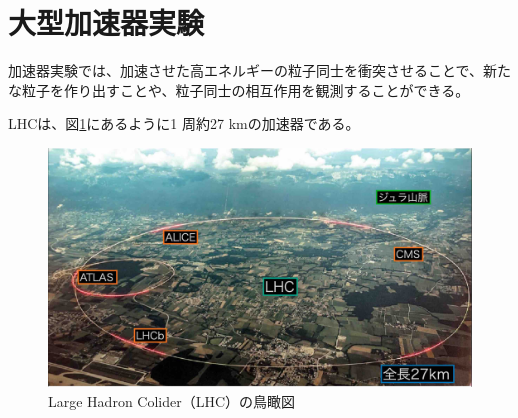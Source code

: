 \section{大型加速器実験}
加速器実験では、加速させた高エネルギーの粒子同士を衝突させることで、新たな粒子を作り出すことや、粒子同士の相互作用を観測することができる。

LHCは、図\ref{fg:LHC}にあるように1 周約27 kmの加速器である。

\begin{figure}[h]  %
    \centering
    \includegraphics[width=12cm]{fig/ch1/LHC.jpg}
    \caption{Large Hadron Colider（LHC）の鳥瞰図\cite{LHCphoto}}
    \label{fg:LHC}
\end{figure}